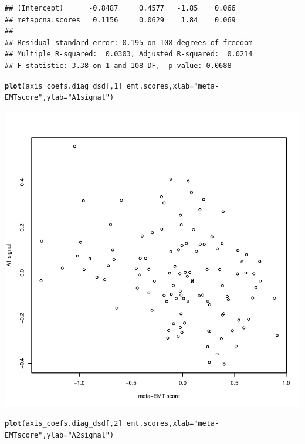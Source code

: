 \documentclass{article}\usepackage[]{graphicx}\usepackage[]{color}
\makeatletter
\def\maxwidth{ %
  \ifdim\Gin@nat@width>\linewidth
    \linewidth
  \else
    \Gin@nat@width
  \fi
}
\newcommand{\hlnum}[1]{\textcolor[rgb]{0.686,0.059,0.569}{#1}}%
\newcommand{\hlstr}[1]{\textcolor[rgb]{0.192,0.494,0.8}{#1}}%
\newcommand{\hlopt}[1]{\textcolor[rgb]{0,0,0}{#1}}%
\newcommand{\hlstd}[1]{\textcolor[rgb]{0.345,0.345,0.345}{#1}}%
\newcommand{\hlkwc}[1]{\textcolor[rgb]{0.333,0.667,0.333}{#1}}%
\newcommand{\hlkwd}[1]{\textcolor[rgb]{0.737,0.353,0.396}{\textbf{#1}}}%
\newenvironment{kframe}{%
 \def\at@end@of@kframe{}%
 \ifinner\ifhmode%
  \def\at@end@of@kframe{\end{minipage}}%
  \begin{minipage}{\columnwidth}%
 \fi\fi%
 \def\FrameCommand##1{\hskip\@totalleftmargin \hskip-\fboxsep
 \colorbox{shadecolor}{##1}\hskip-\fboxsep
     \hskip-\linewidth \hskip-\@totalleftmargin \hskip\columnwidth}%
 \MakeFramed {\advance\hsize-\width
   \@totalleftmargin\z@ \linewidth\hsize
   \@setminipage}}%
 {\par\unskip\endMakeFramed%
 \at@end@of@kframe}
\newenvironment{knitrout}{}{} %
\makeatother
\begin{document}
\begin{knitrout}
\begin{kframe}
\begin{verbatim}
## (Intercept)      -0.8487     0.4577   -1.85    0.066
## metapcna.scores   0.1156     0.0629    1.84    0.069
## 
## Residual standard error: 0.195 on 108 degrees of freedom
## Multiple R-squared:  0.0303,	Adjusted R-squared:  0.0214 
## F-statistic: 3.38 on 1 and 108 DF,  p-value: 0.0688
\end{verbatim}
\begin{alltt}
\hlkwd{plot}\hlstd{(axis_coefs.diag_dsd[,} \hlnum{1}\hlstd{]} \hlopt{~} \hlstd{emt.scores,} \hlkwc{xlab} \hlstd{=} \hlstr{"meta-EMT score"}\hlstd{,} \hlkwc{ylab} \hlstd{=} \hlstr{"A1 signal"}\hlstd{)}
\end{alltt}
\end{kframe}

{\centering \includegraphics[width=\maxwidth]{figure/nmf-msigdb-cor-plots-9} 

}


\begin{kframe}\begin{alltt}
\hlkwd{plot}\hlstd{(axis_coefs.diag_dsd[,} \hlnum{2}\hlstd{]} \hlopt{~} \hlstd{emt.scores,} \hlkwc{xlab} \hlstd{=} \hlstr{"meta-EMT score"}\hlstd{,} \hlkwc{ylab} \hlstd{=} \hlstr{"A2 signal"}\hlstd{)}
\end{alltt}
\end{kframe}


\end{knitrout}
\end{document}
